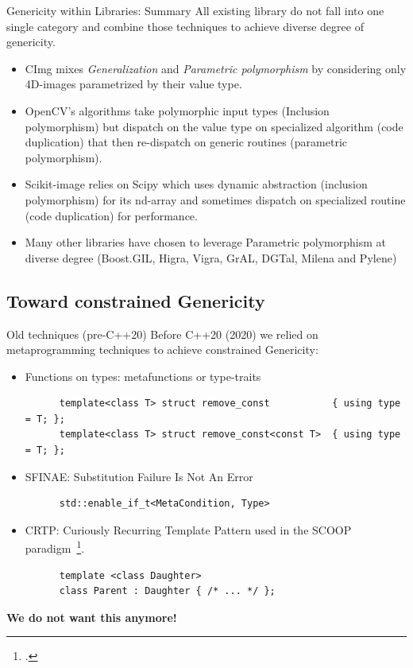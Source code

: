 \documentclass[12pt,aspectratio=169]{beamer}
\begin{document}
\begin{frame}[fragile]{Genericity within Libraries: Summary}
  All existing library do not fall into one single category and combine those techniques to achieve diverse degree of
  genericity.
  \vspace{-0.2cm}\small\begin{itemize}
    \item CImg mixes \emph{Generalization} and \emph{Parametric polymorphism} by considering only 4D-images parametrized
          by their value type.
    \item OpenCV's algorithms take polymorphic input types (Inclusion polymorphism) but dispatch on the value type on
          specialized algorithm (code duplication) that then re-dispatch on generic routines (parametric polymorphism).
    \item Scikit-image relies on Scipy which uses dynamic abstraction (inclusion polymorphism) for its nd-array and
          sometimes dispatch on specialized routine (code duplication) for performance.
    \item Many other libraries have chosen to leverage Parametric polymorphism at diverse degree (Boost.GIL, Higra,
          Vigra, GrAL, DGTal, Milena and Pylene)
  \end{itemize}
\end{frame}

\subsection[Toward constrained Genericity]{Toward constrained Genericity}

\begin{frame}[fragile]{Old techniques (pre-C++20)}
  Before C++20 (2020) we relied on metaprogramming techniques to achieve constrained Genericity:
  \vspace{-0.2cm}\begin{itemize}
    \item Functions on types: metafunctions or type-traits
          \begin{verbatim}
      template<class T> struct remove_const           { using type = T; };
      template<class T> struct remove_const<const T>  { using type = T; };
    \end{verbatim}
    \item SFINAE: Substitution Failure Is Not An Error
          \begin{verbatim}
      std::enable_if_t<MetaCondition, Type>
    \end{verbatim}
    \item CRTP: Curiously Recurring Template Pattern used in the SCOOP paradigm~\footcite{geraud.2008.mpool}.
          \begin{verbatim}
      template <class Daughter>
      class Parent : Daughter { /* ... */ };
    \end{verbatim}
  \end{itemize}
  \vspace{-0.3cm}
  \begin{center}\textbf{We do not want this anymore!}\end{center}
\end{frame}
\end{document}
